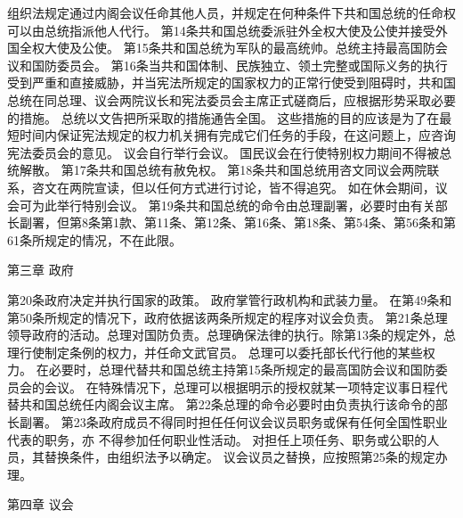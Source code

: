     组织法规定通过内阁会议任命其他人员，并规定在何种条件下共和国总统的任命权可以由总统指派他人代行。
    第14条共和国总统委派驻外全权大使及公使并接受外国全权大使及公使。
    第15条共和国总统为军队的最高统帅。总统主持最高国防会议和国防委员会。
    第16条当共和国体制、民族独立、领土完整或国际义务的执行受到严重和直接威胁，并当宪法所规定的国家权力的正常行使受到阻碍时，共和国总统在同总理、议会两院议长和宪法委员会主席正式磋商后，应根据形势采取必要的措施。
    总统以文告把所采取的措施通告全国。
    这些措施的目的应该是为了在最短时间内保证宪法规定的权力机关拥有完成它们任务的手段，在这问题上，应咨询宪法委员会的意见。
    议会自行举行会议。
    国民议会在行使特别权力期间不得被总统解散。
    第17条共和国总统有赦免权。
    第18条共和国总统用咨文同议会两院联系，咨文在两院宣读，但以任何方式进行讨论，皆不得追究。
    如在休会期间，议会可为此举行特别会议。
    第19条共和国总统的命令由总理副署，必要时由有关部长副署，但第8条第1款、第11条、第12条、第16条、第18条、第54条、第56条和第61条所规定的情况，不在此限。
                           
                               第三章    政府
 
    第20条政府决定并执行国家的政策。
    政府掌管行政机构和武装力量。
    在第49条和第50条所规定的情况下，政府依据该两条所规定的程序对议会负责。
    第21条总理领导政府的活动。总理对国防负责。总理确保法律的执行。除第13条的规定外，总理行使制定条例的权力，并任命文武官员。
    总理可以委托部长代行他的某些权力。
    在必要时，总理代替共和国总统主持第15条所规定的最高国防会议和国防委员会的会议。
    在特殊情况下，总理可以根据明示的授权就某一项特定议事日程代替共和国总统任内阁会议主席。
    第22条总理的命令必要时由负责执行该命令的部长副署。
    第23条政府成员不得同时担任任何议会议员职务或保有任何全国性职业代表的职务，亦    不得参加任何职业性活动。
    对担任上项任务、职务或公职的人员，其替换条件，由组织法予以确定。
    议会议员之替换，应按照第25条的规定办理。
 
                               第四章    议会
 
